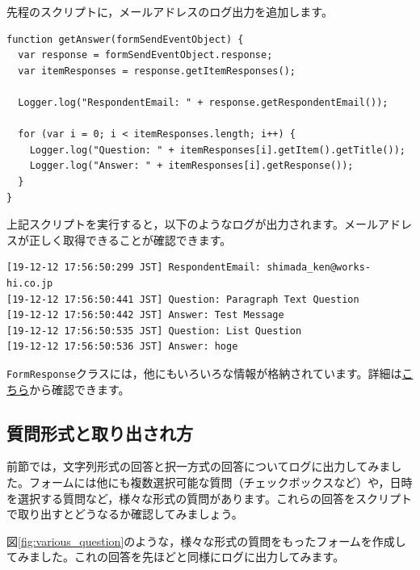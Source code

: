 \documentclass[uplatex,a4j]{jsarticle}
\begin{document}
先程のスクリプトに，メールアドレスのログ出力を追加します。

\begin{lstlisting}[basicstyle=\ttfamily\footnotesize,frame=single,caption=Event Object sample 5]
function getAnswer(formSendEventObject) {
  var response = formSendEventObject.response;
  var itemResponses = response.getItemResponses();
  
  Logger.log("RespondentEmail: " + response.getRespondentEmail());
  
  for (var i = 0; i < itemResponses.length; i++) {
    Logger.log("Question: " + itemResponses[i].getItem().getTitle());
    Logger.log("Answer: " + itemResponses[i].getResponse());
  }
}
\end{lstlisting}

上記スクリプトを実行すると，以下のようなログが出力されます。メールアドレスが正しく取得できることが確認できます。

\begin{lstlisting}[basicstyle=\ttfamily\footnotesize,frame=single,caption=Event Object output example 4]
[19-12-12 17:56:50:299 JST] RespondentEmail: shimada_ken@works-hi.co.jp
[19-12-12 17:56:50:441 JST] Question: Paragraph Text Question
[19-12-12 17:56:50:442 JST] Answer: Test Message
[19-12-12 17:56:50:535 JST] Question: List Question
[19-12-12 17:56:50:536 JST] Answer: hoge
\end{lstlisting}


\verb|FormResponse|クラスには，他にもいろいろな情報が格納されています。詳細は\href{https://developers.google.com/apps-script/reference/forms/form-response?hl=en}{こちら}から確認できます。

\subsection{質問形式と取り出され方}


前節では，文字列形式の回答と択一方式の回答についてログに出力してみました。フォームには他にも複数選択可能な質問（チェックボックスなど）や，日時を選択する質問など，様々な形式の質問があります。これらの回答をスクリプトで取り出すとどうなるか確認してみましょう。

図\ref{fig:various_question}のような，様々な形式の質問をもったフォームを作成してみました。これの回答を先ほどと同様にログに出力してみます。
\end{document}
